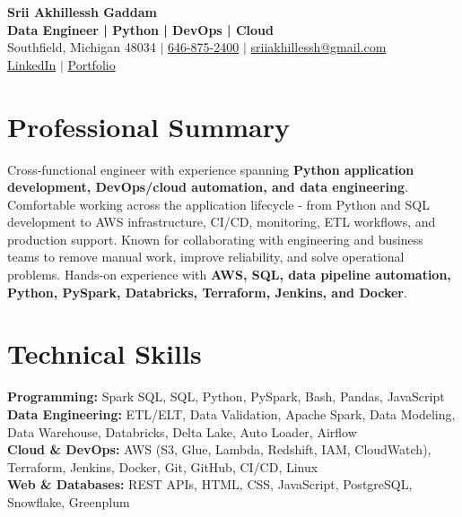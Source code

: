 \documentclass[letterpaper,10pt]{article}
\begin{document}
\fontsize{9.35pt}{10.45pt}\selectfont

\begin{center}
    {\LARGE \textbf{Srii Akhillessh Gaddam}} \\[-1pt]
    \textbf{Data Engineer | Python | DevOps | Cloud} \\[2pt]
    Southfield, Michigan 48034 $|$
    \href{tel:6468752400}{646-875-2400} $|$
    \href{mailto:sriiakhillessh@gmail.com}{sriiakhillessh@gmail.com} \\[1pt]
    \href{https://www.linkedin.com/in/srii-akhiilessh-gaddam-b48668191/}{LinkedIn} $|$
    \href{https://sriiakhillesshg.github.io/portfolio/}{Portfolio}
\end{center}
\vspace{-8pt}

\section{Professional Summary}
\small{Cross-functional engineer with experience spanning \textbf{Python application development, DevOps/cloud automation, and data engineering}. Comfortable working across the application lifecycle - from Python and SQL development to AWS infrastructure, CI/CD, monitoring, ETL workflows, and production support. Known for collaborating with engineering and business teams to remove manual work, improve reliability, and solve operational problems. Hands-on experience with \textbf{AWS, SQL, data pipeline automation, Python, PySpark, Databricks, Terraform, Jenkins, and Docker}.}

\section{Technical Skills}
\small{
\textbf{Programming:} Spark SQL, SQL, Python, PySpark, Bash, Pandas, JavaScript \\
\textbf{Data Engineering:} ETL/ELT, Data Validation, Apache Spark, Data Modeling, Data Warehouse, Databricks, Delta Lake, Auto Loader, Airflow \\
\textbf{Cloud \& DevOps:} AWS (S3, Glue, Lambda, Redshift, IAM, CloudWatch), Terraform, Jenkins, Docker, Git, GitHub, CI/CD, Linux \\
\textbf{Web \& Databases:} REST APIs, HTML, CSS, JavaScript, PostgreSQL, Snowflake, Greenplum
}
\end{document}
